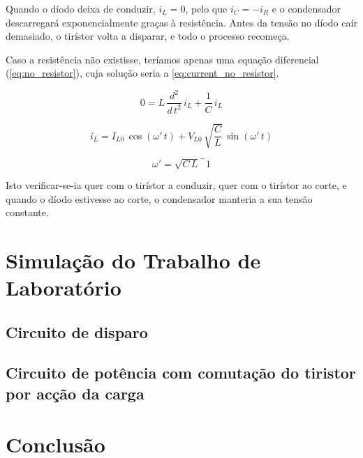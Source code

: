 \documentclass[a4paper,11pt]{article}
\numberwithin{equation}{section}
\begin{document}
Quando o díodo deixa de conduzir, $i_L = 0$, pelo que $i_C = -i_R$ e o condensador descarregará exponencialmente graças à resistência. Antes da tensão no díodo caír demasiado, o tirístor volta a disparar, e todo o processo recomeça.

Caso a resistência não existisse, teríamos apenas uma equação diferencial (\autoref{eq:no_resistor}), cuja solução seria a \autoref{eq:current_no_resistor}.

\begin{equation}
\label{eq:no_resistor}
0 = L\,\frac{d^2}{d\,t^2}\,i_L + \frac{1}{C}\,i_L
\end{equation}

\begin{equation}
\label{eq:current_no_resistor}
i_L = I_{L0}\,\cos{(\omega'\,t)} + V_{L0}\,\sqrt{\frac{C}{L}}\,\sin{(\omega'\,t)}
\end{equation}

\begin{equation}
\omega'=\sqrt{C\,L}^-1
\end{equation}

Isto verificar-se-ia quer com o tirístor a conduzir, quer com o tirístor ao corte, e quando o díodo estivesse ao corte, o condensador manteria a sua tensão constante.

\pagebreak

\section{Simulação do Trabalho de Laboratório}

\subsection{Circuito de disparo}

\subsection{Circuito de potência com comutação do tiristor por acção da carga}

\pagebreak

\section{Conclusão}
\end{document}
